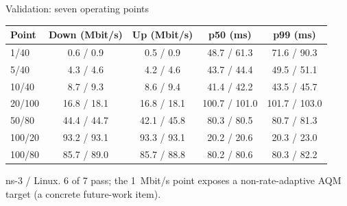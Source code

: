 \documentclass[10pt,aspectratio=169]{beamer}
\begin{document}
\begin{frame}{Validation: seven operating points}
\centering
\small
\begin{tabular}{@{}lcccc@{}}
\toprule
Point & Down (Mbit/s) & Up (Mbit/s) & p50 (ms) & p99 (ms)\\
\midrule
1/40    & 0.6 / 0.9   & 0.5 / 0.9   & 48.7 / 61.3   & 71.6 / 90.3\\
5/40    & 4.3 / 4.6   & 4.2 / 4.6   & 43.7 / 44.4   & 49.5 / 51.1\\
10/40   & 8.7 / 9.3   & 8.6 / 9.4   & 41.4 / 42.2   & 43.5 / 45.7\\
20/100  & 16.8 / 18.1 & 16.8 / 18.1 & 100.7 / 101.0 & 101.7 / 103.0\\
50/80   & 44.4 / 44.7 & 42.1 / 45.8 & 80.3 / 80.5   & 80.7 / 81.3\\
100/20  & 93.2 / 93.1 & 93.3 / 93.1 & 20.2 / 20.6   & 20.3 / 23.0\\
100/80  & 85.7 / 89.0 & 85.7 / 88.8 & 80.2 / 80.6   & 80.3 / 82.2\\
\bottomrule
\end{tabular}
\vspace{1ex}
\small ns-3 / Linux. \alert{6 of 7 pass}; the 1~Mbit/s point exposes a
non-rate-adaptive AQM target (a concrete future-work item).
\end{frame}
\end{document}
